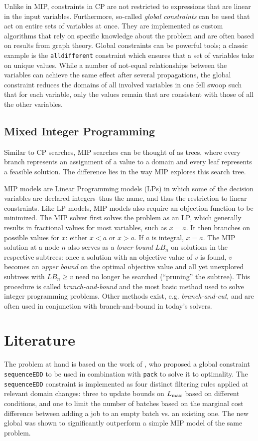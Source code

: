 \documentclass[13pt, letterpaper, oneside]{book}
\begin{document}
Unlike in MIP, constraints in CP are not restricted to expressions that are
linear in the input variables. Furthermore, so-called \textit{global
constraints} can be used that act on entire sets of variables at once. They are
implemented as custom algorithms that rely on specific knowledge about the
problem and are often based on results from graph theory. Global constraints can
be powerful tools; a classic example is the \texttt{alldifferent} constraint
which ensures that a set of variables take on unique values. While a number of
not-equal relationships between the variables can achieve the same effect after
several propagations, the global constraint reduces the domains of all involved
variables in one fell swoop such that for each variable, only the values remain
that are consistent with those of all the other variables.

\subsection{Mixed Integer Programming}
Similar to CP searches, MIP searches can be thought of as trees, where every
branch represents an assignment of a value to a domain and every leaf represents
a feasible solution. The difference lies in the way MIP explores this search tree.

MIP models are Linear Programming models (LPs) in which some of the decision
variables are declared integers--thus the name, and thus the restriction to
linear constraints. Like LP models, MIP models also require an objection
function to be minimized. The MIP solver first solves the problem as an LP,
which generally results in fractional values for most variables, such as $x =
a$. It then branches on possible values for $x$: either $x < a$ or $x > a$. If
$a$ is integral, $x = a$.  The MIP solution at a node $n$ also serves as a
\textit{lower bound} $LB_n$ on solutions in the respective subtrees: once a
solution with an objective value of $v$ is found, $v$ becomes an \textit{upper
bound} on the optimal objective value and all yet unexplored subtrees with $LB_n
\geq v$ need no longer be searched (``pruning'' the subtree). This procedure is
called \textit{branch-and-bound} and the most basic method used to solve integer
programming problems. Other methods exist, e.g. \textit{branch-and-cut}, and are
often used in conjunction with branch-and-bound in today's solvers.

\section{Literature}
The problem at hand is based on the work of \citet{Malapert}, who proposed a global
constraint \texttt{sequenceEDD} to be used in combination with \texttt{pack} to
solve it to optimality. The \texttt{sequenceEDD} constraint is implemented as
four distinct filtering rules applied at relevant domain changes: three to update
bounds on $L_{\text{max}}$ based on different conditions, and one to limit the number of
batches based on the marginal cost difference between adding a job to an empty batch vs. an
existing one. The new global was shown to significantly outperform a simple MIP model of the same problem.
\end{document}
